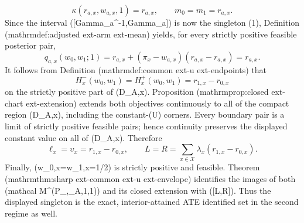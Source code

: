 \[
\kappa(r_{a,x},w_{a,x},1)=r_{a,x},
\qquad m_0=m_1=r_{a,x}.
\]
Since the interval ([Gamma_a^{-1},Gamma_a]) is now the singleton ({1}), Definition (mathrm{def{:}adjusted	ext{-}arm	ext{-}mean}) yields, for every strictly positive feasible posterior pair,
\[
q_{a,x}(w_0,w_1;1)
=r_{a,x}+(\pi_x-w_{a,x})(r_{a,x}-r_{a,x})
=r_{a,x}.
\]
It follows from Definition (mathrm{def{:}common	ext{-}u	ext{-}endpoints}) that
\[
H^-_x(w_0,w_1)=H^+_x(w_0,w_1)=r_{1,x}-r_{0,x}
\]
on the strictly positive part of (D_{A,x}).  Proposition (mathrm{prop{:}closed	ext{-}chart	ext{-}extension}) extends both objectives continuously to all of the compact region (D_{A,x}), including the constant-(U) corners.  Every boundary pair is a limit of strictly positive feasible pairs; hence continuity preserves the displayed constant value on all of (D_{A,x}).  Therefore
\[
\ell_x=\upsilon_x=r_{1,x}-r_{0,x},
\qquad
L=R=\sum_{x\in\mathcal X}\lambda_x(r_{1,x}-r_{0,x}).
\]
Finally, (w_{0,x}=w_{1,x}=1/2) is strictly positive and feasible.  Theorem (mathrm{thm{:}sharp	ext{-}common	ext{-}u	ext{-}envelope}) identifies the images of both (mathcal M^{\circ}(P_{},\Gamma_A,1,1)) and its closed extension with ([L,R]).  Thus the displayed singleton is the exact, interior-attained ATE identified set in the second regime as well.
